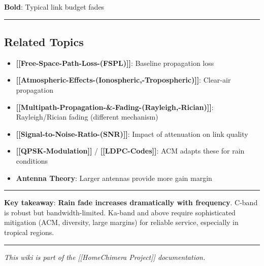 \textbf{Bold}: Typical link budget fades

\begin{center}\rule{0.5\linewidth}{0.5pt}\end{center}

\subsection{Related Topics}\label{related-topics}

\begin{itemize}
\tightlist
\item
  \textbf{{[}{[}Free-Space-Path-Loss-(FSPL){]}{]}}: Baseline propagation
  loss
\item
  \textbf{{[}{[}Atmospheric-Effects-(Ionospheric,-Tropospheric){]}{]}}:
  Clear-air propagation
\item
  \textbf{{[}{[}Multipath-Propagation-\&-Fading-(Rayleigh,-Rician){]}{]}}:
  Rayleigh/Rician fading (different mechanism)
\item
  \textbf{{[}{[}Signal-to-Noise-Ratio-(SNR){]}{]}}: Impact of
  attenuation on link quality
\item
  \textbf{{[}{[}QPSK-Modulation{]}{]}} /
  \textbf{{[}{[}LDPC-Codes{]}{]}}: ACM adapts these for rain conditions
\item
  \textbf{Antenna Theory}: Larger antennas provide more gain margin
\end{itemize}

\begin{center}\rule{0.5\linewidth}{0.5pt}\end{center}

\textbf{Key takeaway}: \textbf{Rain fade increases dramatically with
frequency}. C-band is robust but bandwidth-limited. Ka-band and above
require sophisticated mitigation (ACM, diversity, large margins) for
reliable service, especially in tropical regions.

\begin{center}\rule{0.5\linewidth}{0.5pt}\end{center}

\emph{This wiki is part of the {[}{[}Home\textbar Chimera Project{]}{]}
documentation.}
